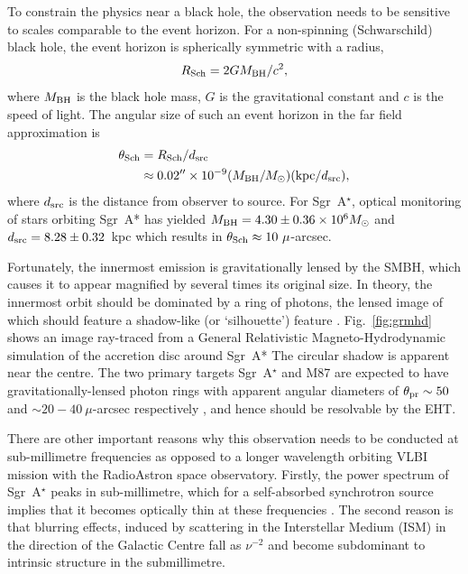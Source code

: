 To constrain the physics near a black hole, the observation needs to be sensitive to scales comparable to the event horizon. For a non-spinning (Schwarschild) black hole, the event horizon is spherically symmetric with a radius, 
\begin{equation}
R_{\rm Sch} = 2 G M_{\rm BH} /c^2,
\end{equation}
where $M_{\rm BH}$ is the black hole mass, $G$ is the gravitational constant and $c$ is the speed of light. The angular size of such an event horizon in the far field approximation is
\begin{align}
\theta_{\rm Sch} &= R_{\rm Sch} / d_{\rm src}\\
&\approx 0.02^{\prime \prime} \times 10^{-9} (M_{\rm BH}/M_\odot)({\rm kpc}/d_{\rm src}),
\end{align}
where $d_{\rm src}$ is the distance from observer to source. For Sgr~A$^\star$, optical monitoring of stars orbiting Sgr~A* \citep{Gillessen_2009} has yielded $M_{\rm BH} = 4.30 \pm 0.36 \times 10^{6} M_\odot$ and $d_{\rm src}= 8.28 \pm 0.32$~kpc which results in $\theta_{\rm Sch} \approx 10\ \mu$-arcsec. 

Fortunately, the innermost emission is gravitationally lensed by the SMBH, which causes it to appear magnified by several times its original size. In theory, the innermost orbit should be dominated by a ring of photons, the lensed image of which should feature a shadow-like (or `silhouette') feature \citep[e.g.][]{Johannsen_2010}. Fig.~\ref{fig:grmhd} shows an image ray-traced from a General Relativistic Magneto-Hydrodynamic simulation of the accretion disc around Sgr~A* \citep{Moscibrodzka_2014} The circular shadow is apparent near the centre. The two primary targets Sgr~A$^\star$ and M87 are expected to have gravitationally-lensed photon rings with apparent angular diameters of $\theta_{\rm pr} \sim 50$ and $\sim 20-40\ \mu$-arcsec respectively \citep*{Falcke_2013,Broderick_2009}, and hence should be resolvable by the EHT. 

There are other important reasons why this observation needs to be conducted at sub-millimetre frequencies as opposed to a longer wavelength orbiting VLBI mission with the RadioAstron space observatory. Firstly, the power spectrum of Sgr~A$^\star$ peaks in sub-millimetre, which for a self-absorbed synchrotron source implies that it becomes optically thin at these frequencies \citep{Serabyn_1997,Falcke_1998}.
The second reason is that blurring effects, induced by scattering in the Interstellar Medium (ISM) in the direction of the Galactic Centre \citep[e.g.][]{Fish_2014} fall as $\nu^{-2}$ and become subdominant to intrinsic structure in the submillimetre.


